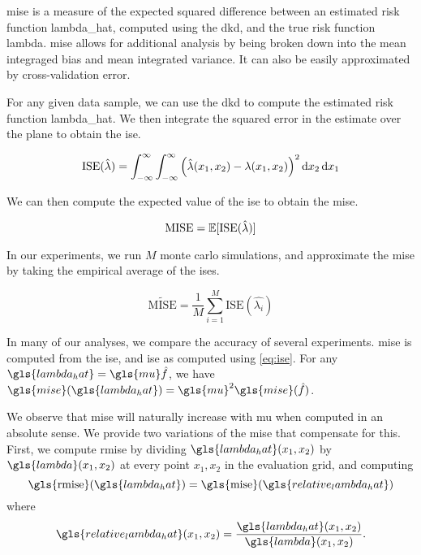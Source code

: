 \Gls{mise} is a measure of the expected squared difference between an estimated risk function \gls{lambda_hat},
computed using the \gls{dkd}, and the true risk function \gls{lambda}.
\Gls{mise} allows for additional analysis by being broken down into the mean integraged bias and mean integrated variance.
It can also be easily approximated by cross-validation error.

For any given data sample, we can use the \gls{dkd} to compute the estimated risk function \gls{lambda_hat}.
We then integrate the squared error in the estimate over the plane to obtain the \gls{ise}.

\begin{equation}
\label{eq:ise}
    \mbox{ISE}(\hat{\lambda}) = 
        \int_{-\infty}^{\infty} \int_{-\infty}^{\infty}
            \left(
                \hat{\lambda}(x_1, x_2) - \lambda(x_1, x_2)
            \right)^2 \mathop{}\!\mathrm{d}{x_2} \mathop{}\!\mathrm{d}{x_1}
\end{equation}

We can then compute the expected value of the \gls{ise} to obtain the \gls{mise}.

\begin{equation}
\label{eq:mise}
    \mbox{MISE} = \mathbb{E} [\mbox{ISE}(\hat{\lambda})]
\end{equation}

In our experiments, we run \(M\) monte carlo simulations, and approximate the \gls{mise} by taking the empirical average of the \glspl{ise}.

\begin{equation}
    \widetilde{\mbox{MISE}} = \frac{1}{M} \sum_{i=1}^{M} \mbox{ISE}(\hat{\lambda_i})
\end{equation}


In many of our analyses, we compare the accuracy of several experiments.
\gls{mise} is computed from the \gls{ise},
and \gls{ise} as computed using \cref{eq:ise}.
For any \(\gls{lambda_hat} = \gls{mu} \hat f \),
we have \( \gls{mise}(\gls{lambda_hat}) = \gls{mu}^2 \gls{mise}(\hat f) \).

We observe that \gls{mise} will naturally increase with \gls{mu} when computed in an absolute sense.
We provide two variations of the \gls{mise} that compensate for this.
First, we compute \gls{rmise} by dividing \(\gls{lambda_hat}(x_1, x_2)\) by \(\gls{lambda}(x_1, x_2)\) at every point \(x_1, x_2\) in the evaluation grid, and computing
\begin{equation}
\label{eq:rmise}
    \mbox{\gls{rmise}}(\gls{lambda_hat}) = 
        \mbox{\gls{mise}}(\gls{relative_lambda_hat}) \\
\end{equation}
where
\begin{equation}
\label{eq:relative_lambda_hat}
    \gls{relative_lambda_hat}(x_1, x_2) = 
        \frac{\gls{lambda_hat}(x_1, x_2)}{\gls{lambda}(x_1, x_2)}
        \text{.}
\end{equation}


